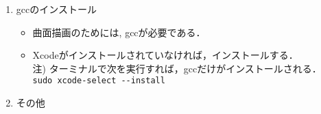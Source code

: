 \documentclass{ujarticle}
\begin{document}
\begin{enumerate}[\bf\large 1.]
\item gccのインストール
  \begin{itemize}
    \item 曲面描画のためには, gccが必要である．
    \item Xcodeがインストールされていなければ，インストールする．\\
    \hspace*{5mm}注) ターミナルで次を実行すれば，gccだけがインストールされる．\\
    \hspace*{20mm}\verb|sudo xcode-select --install|
  \end{itemize}


\item その他


\end{enumerate}
\end{document}
